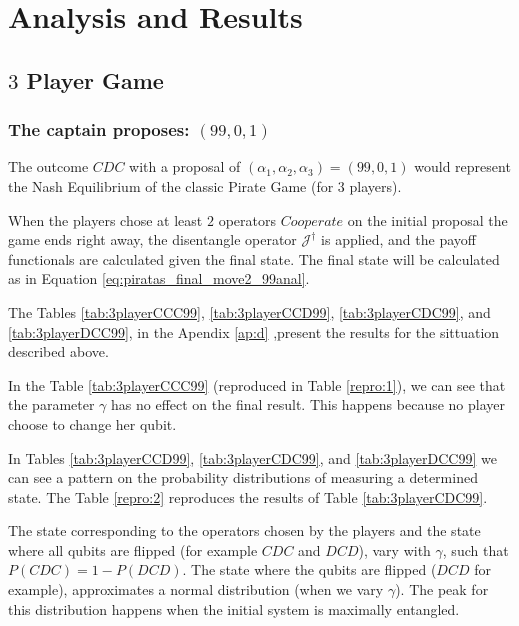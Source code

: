 \section{Analysis and Results}
\label{sec:description_3}


\subsection{$3$ Player Game}
\label{subsec:3playergame}

\subsubsection{The captain proposes: $(99, 0, 1)$}
\label{subsubsec:3playergame99}

The outcome $CDC$ with a proposal of $(\alpha_{1}, \alpha_{2}, \alpha_{3}) =(99, 0, 1)$ would represent the Nash Equilibrium of the classic Pirate Game (for $3$ players). 

When the players chose at least $2$ operators $Cooperate$ on the initial proposal the game ends right away, the disentangle operator $\mathcal{J}^{\dagger}$ is applied, and the payoff functionals are calculated given the final state. The final state will be calculated as in Equation \ref{eq:piratas_final_move2_99anal}. 

The Tables \ref{tab:3playerCCC99}, \ref{tab:3playerCCD99}, \ref{tab:3playerCDC99}, and \ref{tab:3playerDCC99}, in the Apendix \ref{ap:d}
,present the results for the sittuation described above.

In the Table \ref{tab:3playerCCC99} (reproduced in Table \ref{repro:1}), we can see that the parameter $\gamma$ has no effect on the final result. This happens because no player choose to change her qubit. 

In Tables \ref{tab:3playerCCD99}, \ref{tab:3playerCDC99}, and \ref{tab:3playerDCC99} we can see a pattern on the probability distributions of measuring a determined state. The Table \ref{repro:2} reproduces the results of Table \ref{tab:3playerCDC99}.

The state corresponding to the operators chosen by the players and the state where all qubits are flipped (for example $CDC$ and $DCD$), vary with $\gamma$, such that $P(CDC)= 1 - P(DCD)$. The state where the qubits are flipped ($DCD$ for example), approximates a normal distribution (when we vary $\gamma$). The peak for this distribution happens when the initial system is maximally entangled.

